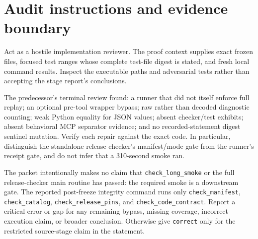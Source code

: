 \section*{Audit instructions and evidence boundary}

Act as a hostile implementation reviewer.  The proof context supplies exact
frozen files, focused test ranges whose complete test-file digest is stated,
and fresh local command results.  Inspect the executable paths and adversarial
tests rather than accepting the stage report's conclusions.

The predecessor's terminal review found: a runner that did not itself enforce
full replay; an optional pre-tool wrapper bypass; raw rather than decoded
diagnostic counting; weak Python equality for JSON values; absent checker/test
exhibits; absent behavioral MCP separator evidence; and no recorded-statement
digest sentinel mutation.  Verify each repair against the exact code.  In
particular, distinguish the standalone release checker's manifest/mode gate
from the runner's receipt gate, and do not infer that a 310-second smoke ran.

The packet intentionally makes no claim that \texttt{check\_long\_smoke} or
the full release-checker main routine has passed: the required smoke is a
downstream gate.  The reported post-freeze integrity command runs only
\texttt{check\_manifest}, \texttt{check\_catalog},
\texttt{check\_release\_pins}, and \texttt{check\_code\_contract}.  Report a
critical error or gap for any remaining bypass, missing coverage, incorrect
execution claim, or broader conclusion.  Otherwise give \texttt{correct} only
for the restricted source-stage claim in the statement.
